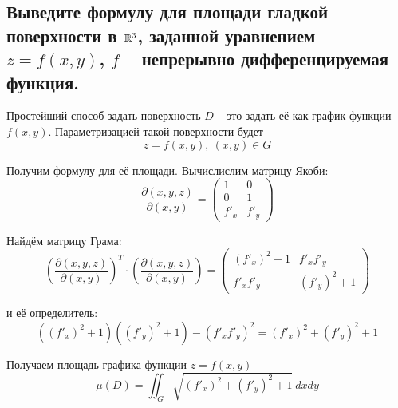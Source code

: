 \subsection{Выведите формулу для площади гладкой поверхности в $\mathbb{R}^3$, заданной уравнением $z = f(x, y)$, $f$ -- непрерывно дифференцируемая функция.}

Простейший способ задать поверхность $D$ -- это задать её как график функции $f(x, y)$. Параметризацией такой поверхности будет
\[ z = f(x, y),\ (x, y) \in G \]

Получим формулу для её площади. Вычислислим матрицу Якоби:
\[ \dfrac{\partial(x, y, z)}{\partial(x, y)} =
\begin{pmatrix}
    1      & 0\\
    0      & 1\\
    f'_{x} & f'_{y}
\end{pmatrix}
\]

Найдём матрицу Грама:
\[ \left(\dfrac{\partial(x, y, z)}{\partial(x, y)}\right)^T \cdot \left(\dfrac{\partial(x, y, z)}{\partial(x, y)}\right) = 
\begin{pmatrix}
    (f'_{x})^2 + 1 & f'_{x}f'_{y}\\
    f'_{x}f'_{y}   & (f'_{y})^2 + 1
\end{pmatrix}
\]

и её определитель:
\[ ((f'_{x})^2 + 1)((f'_{y})^2 + 1) - (f'_{x}f'_{y})^2 = (f'_{x})^2 + (f'_{y})^2 + 1 \]

Получаем площадь графика функции $z = f(x, y)$
\[ \mu(D) = \iint_{G} \sqrt{(f'_{x})^2 + (f'_{y})^2 + 1}\ dxdy \]